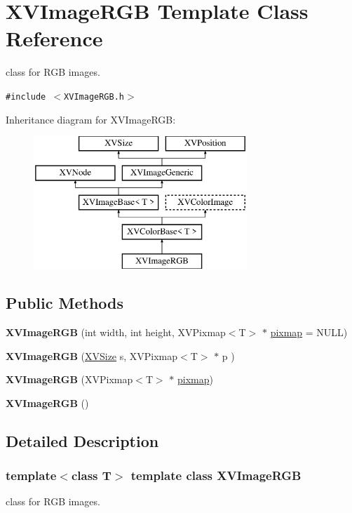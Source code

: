 \hypertarget{class_XVImageRGB}{
\section{XVImage\-RGB  Template Class Reference}
\label{XVImageRGB}
}
class for RGB images. 


{\tt \#include $<$XVImage\-RGB.h$>$}

Inheritance diagram for XVImage\-RGB:\begin{figure}[H]
\begin{center}
\leavevmode
\includegraphics[height=5cm]{class_XVImageRGB}
\end{center}
\end{figure}
\subsection*{Public Methods}
\begin{CompactItemize}
\item 
{\bf XVImage\-RGB} (int width, int height, XVPixmap$<$T$>$ $\ast$ \hyperlink{class_XVImageBase_n1}{pixmap} = NULL)
\item 
{\bf XVImage\-RGB} (\hyperlink{class_XVSize}{XVSize} s, XVPixmap$<$T$>$ $\ast$ p )
\item 
{\bf XVImage\-RGB} (XVPixmap$<$T$>$ $\ast$ \hyperlink{class_XVImageBase_n1}{pixmap})
\item 
{\bf XVImage\-RGB} ()
\end{CompactItemize}


\subsection{Detailed Description}
\subsubsection*{template$<$class T$>$  template class XVImage\-RGB}

class for RGB images.





